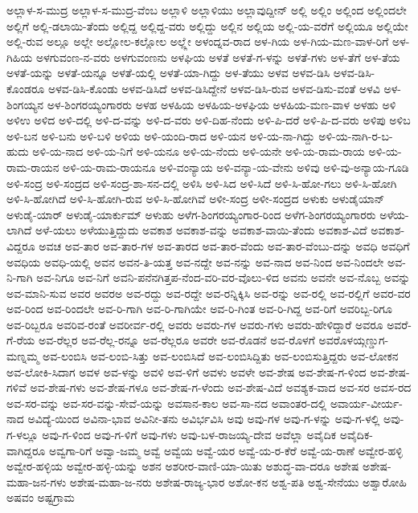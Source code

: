 ಅಲ್ಲಾಳ-ಸ-ಮುದ್ರ
ಅಲ್ಲಾಳ-ಸ-ಮುದ್ರ-ವೆಂಬ
ಅಲ್ಲಾಳಿ
ಅಲ್ಲಾಳಿಯು
ಅಲ್ಲಾವುದ್ದೀನ್
ಅಲ್ಲಿ
ಅಲ್ಲಿಂ
ಅಲ್ಲಿಂದ
ಅಲ್ಲಿಂದಲೇ
ಅಲ್ಲಿಗೆ
ಅಲ್ಲಿ-ಡಲಾಯಿ-ತೆಂದು
ಅಲ್ಲಿದ್ದ
ಅಲ್ಲಿದ್ದ-ವರು
ಅಲ್ಲಿದ್ದು
ಅಲ್ಲಿನ
ಅಲ್ಲಿಯ
ಅಲ್ಲಿ-ಯ-ವರೆಗೆ
ಅಲ್ಲಿಯೂ
ಅಲ್ಲಿಯೇ
ಅಲ್ಲಿ-ರುವ
ಅಲ್ಲೂ
ಅಲ್ಲೇ
ಅಲ್ಲೋಲ-ಕಲ್ಲೋಲ
ಅಲ್ಲ್ಲೇ
ಅಳಂದ್ನವ-ರಾದ
ಅಳ-ಗಿಯ
ಅಳ-ಗಿಯ-ಮಣ-ವಾಳ-ರಿಗೆ
ಅಳ-ಗಿಹಿಯ
ಅಳಗುವಂಣ-ನ-ವರು
ಅಳಗುವಂಣನು
ಅಳಘಿಯ
ಅಳತೆ
ಅಳತೆ-ಗ-ಳನ್ನು
ಅಳತೆ-ಗಳು
ಅಳ-ತೆಗೆ
ಅಳ-ತೆಯ
ಅಳತೆ-ಯನ್ನು
ಅಳತೆ-ಯನ್ನೂ
ಅಳತೆ-ಯಲ್ಲಿ
ಅಳತೆ-ಯಾ-ಗಿದ್ದು
ಅಳ-ತೆಯು
ಅಳವ
ಅಳವ-ಡಿಸಿ
ಅಳವ-ಡಿಸಿ-ಕೊಂಡರೂ
ಅಳವ-ಡಿಸಿ-ಕೊಂಡು
ಅಳವ-ಡಿಸಿದೆ
ಅಳವ-ಡಿಸಿದ್ದೇನೆ
ಅಳವ-ಡಿಸಿ-ರುವ
ಅಳವ-ಡಿಸು-ವಂತೆ
ಅಳವಿ
ಅಳ-ಶಿಂಗಯ್ಯನ
ಅಳ-ಶಿಂಗರಯ್ಯಂಗಾರರು
ಅಳಹ
ಅಳಹಿಯ
ಅಳಹಿಯ-ಅಳಘಿಯ
ಅಳಹಿಯ-ಮಣ-ವಾಳ
ಅಳಹು
ಅಳಿ
ಅಳಿಉ
ಅಳಿದ
ಅಳಿ-ದಲ್ಲಿ
ಅಳಿ-ದ-ವನ್ನು
ಅಳಿ-ದ-ವರು
ಅಳಿ-ದಿಹ-ನೆಂದು
ಅಳಿ-ಪಿ-ದರೆ
ಅಳಿ-ಪಿ-ದ-ವರು
ಅಳಿಪು
ಅಳಿಬ
ಅಳಿ-ಬನ
ಅಳಿ-ಬನು
ಅಳಿ-ಬಳಿ
ಅಳಿಯ
ಅಳಿ-ಯಂದಿ-ರಾದ
ಅಳಿ-ಯನ
ಅಳಿ-ಯ-ನಾ-ಗಿದ್ದು
ಅಳಿ-ಯ-ನಾಗಿ-ರ-ಬ-ಹುದು
ಅಳಿ-ಯ-ನಾದ
ಅಳಿ-ಯ-ನಿಗೆ
ಅಳಿ-ಯನೂ
ಅಳಿ-ಯ-ನೆಂದು
ಅಳಿ-ಯನೇ
ಅಳಿ-ಯ-ರಾಮ-ರಾಯ
ಅಳಿ-ಯ-ರಾಮ-ರಾಯನ
ಅಳಿ-ಯ-ರಾಮ-ರಾಯನೂ
ಅಳಿ-ವಂನ್ಯಾಯ
ಅಳಿ-ವನ್ಯಾ-ಯ-ವೇನು
ಅಳಿವು
ಅಳಿ-ವು-ಅನ್ಯಾಯ-ಗೂಡಿ
ಅಳಿ-ಸಂದ್ರ
ಅಳಿ-ಸಂದ್ರದ
ಅಳಿ-ಸಂದ್ರ-ಶಾ-ಸನ-ದಲ್ಲಿ
ಅಳಿಸಿ
ಅಳಿ-ಸಿದ
ಅಳಿ-ಸಿದೆ
ಅಳಿ-ಸಿ-ಹೋ-ಗಲು
ಅಳಿ-ಸಿ-ಹೋಗಿ
ಅಳಿ-ಸಿ-ಹೋಗಿದೆ
ಅಳಿ-ಸಿ-ಹೋಗಿ-ರುವ
ಅಳಿ-ಸಿ-ಹೋಗಿವೆ
ಅಳೀ-ಸಂದ್ರ
ಅಳೀ-ಸಂದ್ರದ
ಅಳುಕು
ಅಳುಡೈಯಾನ್
ಅಳುಡೈ-ಯಾರ್
ಅಳುಡೈ-ಯಾರ್ಕುಮ್
ಅಳುಹು
ಅಳೆಗ-ಶಿಂಗರಯ್ಯಂಗಾರ-ರಿಂದ
ಅಳೆಗ-ಶಿಂಗರಯ್ಯಂಗಾರರು
ಅಳೆಯ-ಲಾಗಿದೆ
ಅಳೆ-ಯಲು
ಅಳೆಯುತ್ತಿದ್ದುದು
ಅವಕಾಶ
ಅವಕಾಶ-ವನ್ನು
ಅವಕಾಶ-ವಾಯಿ-ತೆಂದು
ಅವಕಾಶ-ವಿದೆ
ಅವಕಾಶ-ವಿದ್ದರೂ
ಅವಚ
ಅವ-ತಾರ
ಅವ-ತಾರ-ಗಳ
ಅವ-ತಾರದ
ಅವ-ತಾರ-ವೆಂದು
ಅವ-ತಾರ-ವೆಂಬು-ದನ್ನು
ಅವಧಿ
ಅವಧಿಗೆ
ಅವಧಿಯ
ಅವಧಿ-ಯಲ್ಲಿ
ಅವನ
ಅವನ-ತಿ-ಯತ್ತ
ಅವ-ನದ್ದೇ
ಅವ-ನನ್ನು
ಅವ-ನಾದ
ಅವ-ನಿಂದ
ಅವ-ನಿಂದಲೇ
ಅವ-ನಿ-ಗಾಗಿ
ಅವ-ನಿಗೂ
ಅವ-ನಿಗೆ
ಅವನಿ-ಪನೆನಗಿತ್ತಪ-ನೆಂದ-ವರಿ-ವರ-ವೊಲು-ಳಿದ
ಅವನು
ಅವನೇ
ಅವ-ನೊಬ್ಬ
ಅವನ್ನು
ಅವ-ಮಾನಿ-ಸುವ
ಅವರ
ಅವರಅ
ಅವ-ರದ್ದು
ಅವ-ರದ್ದೇ
ಅವ-ರನ್ನಿಕ್ಕಿಸಿ
ಅವ-ರನ್ನು
ಅವ-ರಲ್ಲಿ
ಅವ-ರಲ್ಲಿಗೆ
ಅವರ-ವರ
ಅವ-ರಿಂದ
ಅವ-ರಿಂದಲೇ
ಅವ-ರಿ-ಗಾಗಿ
ಅವ-ರಿ-ಗಾಗಿಯೇ
ಅವ-ರಿ-ಗಿಂತ
ಅವ-ರಿ-ಗಿದ್ದ
ಅವ-ರಿಗೆ
ಅವರಿಬ್ಬ-ರಿಗೂ
ಅವ-ರಿಬ್ಬರೂ
ಅವರಿವ-ರಂತೆ
ಅವರೀರ್ವ-ರಲ್ಲಿ
ಅವರು
ಅವರು-ಗಳ
ಅವರು-ಗಳು
ಅವರು-ಹೇಳಿದ್ದಾರೆ
ಅವರೂ
ಅವರೆ-ಗೆ-ರೆಯ
ಅವ-ರೆಲ್ಲರ
ಅವ-ರೆಲ್ಲ-ರನ್ನೂ
ಅವ-ರೆಲ್ಲರೂ
ಅವರೇ
ಅವ-ರೊಡನೆ
ಅವ-ರೊಳಗೆ
ಅವರೊಳಯ್ಗಣ್ಡುಗ-ಮಣ್ನಮ್ಮ
ಅವ-ಲಂಬಿಸಿ
ಅವ-ಲಂಬಿ-ಸಿತ್ತು
ಅವ-ಲಂಬಿಸಿದೆ
ಅವ-ಲಂಬಿಸಿದ್ದಿತು
ಅವ-ಲಂಬಿಸುತ್ತಿದ್ದರು
ಅವ-ಲೋಕನ
ಅವ-ಲೋಕಿ-ಸಿದಾಗ
ಅವಳ
ಅವ-ಳನ್ನು
ಅವಳಿ
ಅವ-ಳಿಗೆ
ಅವಳು
ಅವಳೇ
ಅವ-ಶೇಷ
ಅವ-ಶೇಷ-ಗ-ಳಿಂದ
ಅವ-ಶೇಷ-ಗಳಿವೆ
ಅವ-ಶೇಷ-ಗಳು
ಅವ-ಶೇಷ-ಗಳೂ
ಅವ-ಶೇಷ-ಗ-ಳೆಂದು
ಅವ-ಶೇಷ-ವಿದೆ
ಅವಶ್ಯಕ-ವಾದ
ಅವ-ಸರ
ಅವಸ-ರದ
ಅವ-ಸರ-ವನ್ನು
ಅವ-ಸರ-ವನ್ನು-ಸೇವೆ-ಯನ್ನು
ಅವಸಾನ-ಕಾಲ
ಅವ-ಸಾ-ನದ
ಅವಾಂತರ-ದಲ್ಲಿ
ಅವಾರ್ಯ-ವೀರ್ಯ-ನಾದ
ಅವಿದ್ಯೆ-ಯಿಂದ
ಅವಿನಾ-ಭಾವ
ಅವಿನೀ-ತನು
ಅವಿರ್ಭವಿಸಿ
ಅವು
ಅವು-ಗಳ
ಅವು-ಗ-ಳನ್ನು
ಅವು-ಗ-ಳಲ್ಲಿ
ಅವು-ಗ-ಳಲ್ಲೂ
ಅವು-ಗ-ಳಿಂದ
ಅವು-ಗ-ಳಿಗೆ
ಅವು-ಗಳು
ಅವು-ಬಳ-ರಾಜಯ್ಯ-ದೇವ
ಅವೆಲ್ಲಾ
ಅವೈದಿಕ
ಅವೈದಿಕ-ವಾಗಿದ್ದರೂ
ಅವ್ವಗಾ-ರಿಗೆ
ಅವ್ವಾ-ಜಮ್ಮ
ಅವ್ವೆ
ಅವ್ವೆಯ
ಅವ್ವೆ-ಯರ
ಅವ್ವೆ-ಯ-ರ-ಕೆರೆ
ಅವ್ವೆ-ಯ-ರಾಣೆ
ಅವ್ವೇರ-ಹಳ್ಳಿ
ಅವ್ವೇರ-ಹಳ್ಳಿಯ
ಅವ್ವೇರ-ಹಳ್ಳಿ-ಯನ್ನು
ಅಶನ
ಅಶರೀರ-ವಾಣಿ-ಯಾ-ಯಿತು
ಅಶುದ್ಧ-ವಾ-ದರೂ
ಅಶೇಷ
ಅಶೇಷ-ಮಹಾ-ಜನ-ಗಳು
ಅಶೇಷ-ಮಹಾ-ಜ-ನರು
ಅಶೇಷ-ರಾಜ್ಯ-ಭಾರ
ಅಶೋ-ಕನ
ಅಶ್ವ-ಪತಿ
ಅಶ್ವ-ಸೇನೆಯು
ಅಶ್ವಾರೋಹಿ
ಅಷವಂ
ಅಷ್ಟಗ್ರಾಮ
